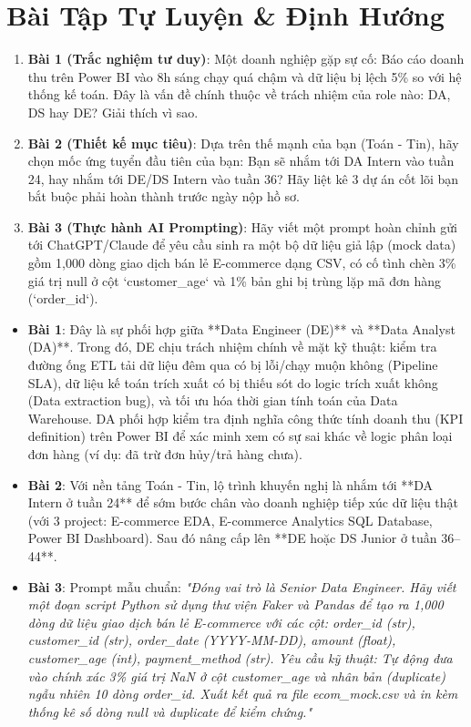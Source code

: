 \section{Bài Tập Tự Luyện \& Định Hướng}

\begin{baitapbox}
\begin{enumerate}
    \item \textbf{Bài 1 (Trắc nghiệm tư duy)}: Một doanh nghiệp gặp sự cố: Báo cáo doanh thu trên Power BI vào 8h sáng chạy quá chậm và dữ liệu bị lệch 5\% so với hệ thống kế toán. Đây là vấn đề chính thuộc về trách nhiệm của role nào: DA, DS hay DE? Giải thích vì sao.
    \item \textbf{Bài 2 (Thiết kế mục tiêu)}: Dựa trên thế mạnh của bạn (Toán - Tin), hãy chọn mốc ứng tuyển đầu tiên của bạn: Bạn sẽ nhắm tới DA Intern vào tuần 24, hay nhắm tới DE/DS Intern vào tuần 36? Hãy liệt kê 3 dự án cốt lõi bạn bắt buộc phải hoàn thành trước ngày nộp hồ sơ.
    \item \textbf{Bài 3 (Thực hành AI Prompting)}: Hãy viết một prompt hoàn chỉnh gửi tới ChatGPT/Claude để yêu cầu sinh ra một bộ dữ liệu giả lập (mock data) gồm 1,000 dòng giao dịch bán lẻ E-commerce dạng CSV, có cố tình chèn 3\% giá trị null ở cột `customer\_age` và 1\% bản ghi bị trùng lặp mã đơn hàng (`order\_id`).
\end{enumerate}
\end{baitapbox}

\begin{dapanbox}
\begin{itemize}
    \item \textbf{Bài 1}: Đây là sự phối hợp giữa **Data Engineer (DE)** và **Data Analyst (DA)**. Trong đó, DE chịu trách nhiệm chính về mặt kỹ thuật: kiểm tra đường ống ETL tải dữ liệu đêm qua có bị lỗi/chạy muộn không (Pipeline SLA), dữ liệu kế toán trích xuất có bị thiếu sót do logic trích xuất không (Data extraction bug), và tối ưu hóa thời gian tính toán của Data Warehouse. DA phối hợp kiểm tra định nghĩa công thức tính doanh thu (KPI definition) trên Power BI để xác minh xem có sự sai khác về logic phân loại đơn hàng (ví dụ: đã trừ đơn hủy/trả hàng chưa).
    \item \textbf{Bài 2}: Với nền tảng Toán - Tin, lộ trình khuyến nghị là nhắm tới **DA Intern ở tuần 24** để sớm bước chân vào doanh nghiệp tiếp xúc dữ liệu thật (với 3 project: E-commerce EDA, E-commerce Analytics SQL Database, Power BI Dashboard). Sau đó nâng cấp lên **DE hoặc DS Junior ở tuần 36--44**.
    \item \textbf{Bài 3}: Prompt mẫu chuẩn:
    \textit{"Đóng vai trò là Senior Data Engineer. Hãy viết một đoạn script Python sử dụng thư viện Faker và Pandas để tạo ra 1,000 dòng dữ liệu giao dịch bán lẻ E-commerce với các cột: order\_id (str), customer\_id (str), order\_date (YYYY-MM-DD), amount (float), customer\_age (int), payment\_method (str). Yêu cầu kỹ thuật: Tự động đưa vào chính xác 3\% giá trị NaN ở cột customer\_age và nhân bản (duplicate) ngẫu nhiên 10 dòng order\_id. Xuất kết quả ra file ecom\_mock.csv và in kèm thống kê số dòng null và duplicate để kiểm chứng."}
\end{itemize}
\end{dapanbox}
